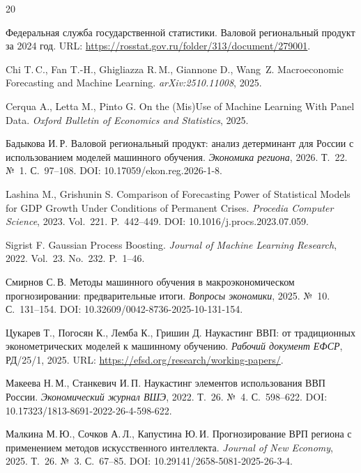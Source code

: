 \documentclass[12pt,a4paper]{article}
\begin{document}
\newpage
\begin{thebibliography}{20}

Федеральная служба государственной статистики. Валовой региональный
продукт за 2024 год. URL:
\url{https://rosstat.gov.ru/folder/313/document/279001}.

Chi T.\,C., Fan T.-H., Ghigliazza R.\,M., Giannone D., Wang~Z.
Macroeconomic Forecasting and Machine Learning.
\textit{arXiv:2510.11008}, 2025.

Cerqua A., Letta M., Pinto G.
On the (Mis)Use of Machine Learning With Panel Data.
\textit{Oxford Bulletin of Economics and Statistics}, 2025.

Бадыкова И.\,Р. Валовой региональный продукт: анализ детерминант
для России с использованием моделей машинного обучения.
\textit{Экономика региона}, 2026. Т.~22. №~1. С.~97--108.
DOI: 10.17059/ekon.reg.2026-1-8.

Lashina M., Grishunin S.
Comparison of Forecasting Power of Statistical Models for GDP Growth
Under Conditions of Permanent Crises.
\textit{Procedia Computer Science}, 2023. Vol.~221. P.~442--449.
DOI: 10.1016/j.procs.2023.07.059.

Sigrist F. Gaussian Process Boosting.
\textit{Journal of Machine Learning Research}, 2022.
Vol.~23. No.~232. P.~1--46.

Смирнов С.\,В. Методы машинного обучения в макроэкономическом
прогнозировании: предварительные итоги.
\textit{Вопросы экономики}, 2025. №~10. С.~131--154.
DOI: 10.32609/0042-8736-2025-10-131-154.

Цукарев Т., Погосян К., Лемба К., Гришин Д.
Наукастинг ВВП: от традиционных эконометрических моделей к машинному
обучению. \textit{Рабочий документ ЕФСР}, РД/25/1, 2025.
URL: \url{https://efsd.org/research/working-papers/}.

Макеева Н.\,М., Станкевич И.\,П.
Наукастинг элементов использования ВВП России.
\textit{Экономический журнал ВШЭ}, 2022. Т.~26. №~4. С.~598--622.
DOI: 10.17323/1813-8691-2022-26-4-598-622.

Малкина М.\,Ю., Сочков А.\,Л., Капустина Ю.\,И.
Прогнозирование ВРП региона с применением методов искусственного
интеллекта.
\textit{Journal of New Economy}, 2025. Т.~26. №~3. С.~67--85.
DOI: 10.29141/2658-5081-2025-26-3-4.


\end{thebibliography}
\end{document}
